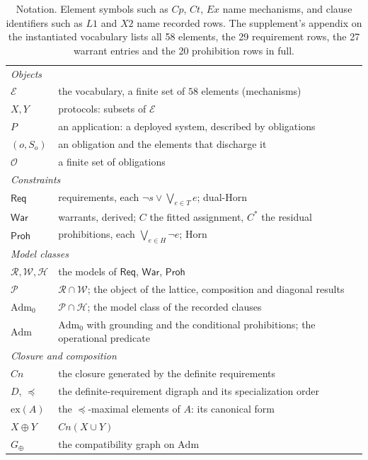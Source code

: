 \documentclass[11pt,reqno]{amsart}
\theoremstyle{plain}
\theoremstyle{definition}
\theoremstyle{remark}
\newcommand{\Pos}{\mathcal{P}}
\newcommand{\Adm}{\mathrm{Adm}_{0}}
\newcommand{\Admf}{\mathrm{Adm}}
\newcommand{\El}{\mathcal{E}}
\newcommand{\Law}{\mathsf{Req}}
\newcommand{\Haz}{\mathsf{Proh}}
\newcommand{\War}{\mathsf{War}}
\begin{document}
\begin{table}[t]\centering\small
\begin{tabular}{ll}
\toprule
\multicolumn{2}{l}{\emph{Objects}}\\
$\El$ & the vocabulary, a finite set of $58$ elements (mechanisms)\\
$X, Y$ & protocols: subsets of $\El$\\
$P$ & an application: a deployed system, described by obligations\\
$(o, S_{o})$ & an obligation and the elements that discharge it\\
$\mathcal{O}$ & a finite set of obligations\\
\midrule
\multicolumn{2}{l}{\emph{Constraints}}\\
$\Law$ & requirements, each $\neg s \vee \bigvee_{e \in T} e$; dual-Horn\\
$\War$ & warrants, derived; $C$ the fitted assignment, $C^{\ast}$ the residual\\
$\Haz$ & prohibitions, each $\bigvee_{e \in H} \neg e$; Horn\\
\midrule
\multicolumn{2}{l}{\emph{Model classes}}\\
$\mathcal{R},\mathcal{W},\mathcal{H}$ & the models of $\Law$, $\War$, $\Haz$\\
$\Pos$ & $\mathcal{R} \cap \mathcal{W}$; the object of the lattice, composition and diagonal results\\
$\Adm$ & $\Pos \cap \mathcal{H}$; the model class of the recorded clauses\\
$\Admf$ & $\Adm$ with grounding and the conditional prohibitions; the operational predicate\\
\midrule
\multicolumn{2}{l}{\emph{Closure and composition}}\\
$Cn$ & the closure generated by the definite requirements\\
$D$, $\preceq$ & the definite-requirement digraph and its specialization order\\
$\mathrm{ex}(A)$ & the $\preceq$-maximal elements of $A$: its canonical form\\
$X \oplus Y$ & $Cn(X \cup Y)$\\
$G_\oplus$ & the compatibility graph on $\Admf$\\
\bottomrule
\end{tabular}
\caption{Notation. Element symbols such as $Cp$, $Ct$, $Ex$ name mechanisms,
and clause identifiers such as $L1$ and $X2$ name recorded rows. The
supplement's appendix on the instantiated vocabulary lists all 58 elements,
the 29 requirement rows, the 27 warrant entries and the 20 prohibition rows
in full.}
\label{tab:notation}
\end{table}
\end{document}

